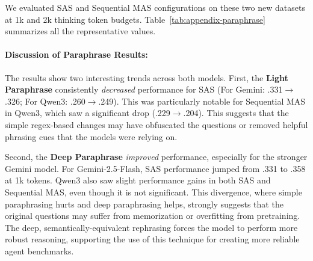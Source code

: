 \documentclass{article} %
\begin{document}
We evaluated SAS and Sequential MAS configurations on these two new datasets at 1k and 2k thinking token budgets. Table~\ref{tab:appendix-paraphrase} summarizes all the representative values.

\paragraph{Discussion of Paraphrase Results:}
The results show two interesting trends across both models. First, the \textbf{Light Paraphrase} consistently \emph{decreased} performance for SAS (For Gemini: .331$\to$.326; For Qwen3: .260$\to$.249). This was particularly notable for Sequential MAS in Qwen3, which saw a significant drop (.229$\to$.204). This suggests that the simple regex-based changes may have obfuscated the questions or removed helpful phrasing cues that the models were relying on.

Second, the \textbf{Deep Paraphrase} \emph{improved} performance, especially for the stronger Gemini model. For Gemini-2.5-Flash, SAS performance jumped from .331 to .358 at 1k tokens. Qwen3 also saw slight performance gains in both SAS and Sequential MAS, even though it is not significant. This divergence, where simple paraphrasing hurts and deep paraphrasing helps, strongly suggests that the original questions may suffer from memorization or overfitting from pretraining. The deep, semantically-equivalent rephrasing forces the model to perform more robust reasoning, supporting the use of this technique for creating more reliable agent benchmarks.
\end{document}

